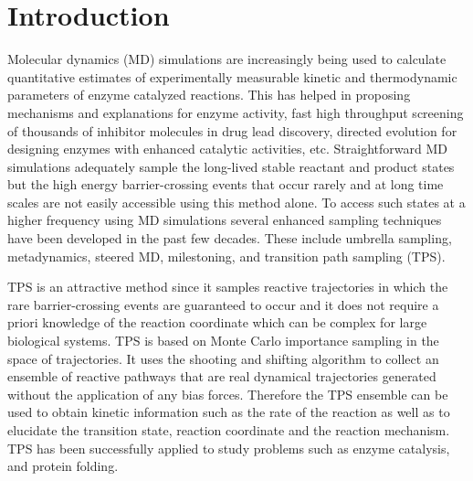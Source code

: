 \documentclass[journal=jpcbfk,manuscript=article,layout=traditional]{achemso}
\begin{document}
\section{Introduction}
Molecular dynamics (MD) simulations are increasingly being
used to calculate quantitative estimates of experimentally measurable 
kinetic and thermodynamic parameters of enzyme catalyzed reactions. 
\cite{Karplus02NatStructMolBiol9p646,
Schramm98AnnuRevBiochem67p693,Zhang05AccChemRes38p379,
Schramm11AnnuRevBiochem80p703,Schramm18ChemRev118p11194} 
This has helped in proposing mechanisms and explanations for 
enzyme activity, fast high throughput screening of thousands of inhibitor 
molecules in drug lead discovery, \cite{Jorgensen09AccChemRes42p724,Sliwoski14PharmacolRev66p334} 
directed evolution for designing enzymes with enhanced catalytic 
activities, \cite{Thyme09Nature461p1300,Bloom09PNAS106p9995,Schafer19JAmChemSoc141p10431} etc.    
Straightforward MD simulations adequately sample 
the long-lived stable reactant and product states 
but the high energy barrier-crossing events that occur rarely and at long 
time scales are not easily accessible using this method alone.
To access such states at a higher frequency using MD simulations 
several enhanced sampling techniques 
have been developed in the past few decades. These include 
umbrella sampling, \cite{Kastner11WileyInterdiscipRevComputMolSci1p932} 
metadynamics, \cite{Barducci11WileyInterdiscipRevComputMolSci1p826}
steered MD, \cite{Park04JChemPhys120p5946}
milestoning, \cite{Faradjian04JChemPhys120p10880} and transition path sampling 
(TPS). \cite{Pratt86JChemPhys85p5045,Bolhuis02AnnRevPhysChem53p291,
Dellago98JChemPhys108p1964,Bolhuis21AdvTheory4p2000237}

TPS is an attractive method since it samples reactive trajectories
in which the rare barrier-crossing events are guaranteed to occur and
it does not require a priori knowledge of the reaction coordinate which can be 
complex for large biological systems.
TPS is based on Monte Carlo importance sampling in the 
space of trajectories. It uses the shooting and shifting algorithm 
to collect an ensemble of reactive pathways that are real dynamical 
trajectories generated without the application of any bias forces. \cite{dellago02AdvChemPhys123} 
Therefore the TPS ensemble can be used to obtain 
kinetic information such as the rate of the reaction as well as to elucidate 
the transition state, reaction coordinate and the reaction mechanism. 
TPS has been successfully applied to study problems such as enzyme catalysis, 
\cite{Antoniou01JPhysChemB105p5553,Hay12NatChem4p161,Schwartz09NatChemBiol5p551} 
and protein folding. \cite{Bolhuis03ProcNatlAcadSci100p12129,Juraszek12ChemPhys396p30}
\end{document}
